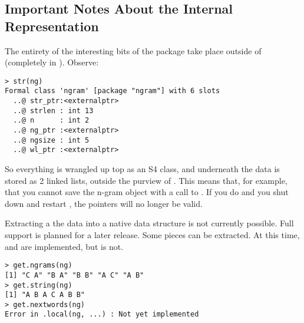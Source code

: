 \subsection{Important Notes About the Internal Representation}

The entirety of the interesting bits of the \thispackage package take place 
outside of \R (completely in \C).  Observe:
\begin{lstlisting}[language=inteRactive]
> str(ng)
Formal class 'ngram' [package "ngram"] with 6 slots
  ..@ str_ptr:<externalptr> 
  ..@ strlen : int 13
  ..@ n      : int 2
  ..@ ng_ptr :<externalptr> 
  ..@ ngsize : int 5
  ..@ wl_ptr :<externalptr> 
\end{lstlisting}

So everything is wrangled up top as an S4 class, and underneath the data is 
stored as 2 linked lists, outside the purview of \R.  This means that, for 
example, that you cannot save the n-gram object with a call to .  
If you do and you shut down and restart \R, the pointers will no longer be 
valid.

Extracting a the data into a native \R data structure is not currently 
possible.  Full support is planned for a later release.  Some pieces can be 
extracted.  At this time,  and  are 
implemented, but  is not.

\begin{lstlisting}[language=inteRactive]
> get.ngrams(ng)
[1] "C A" "B A" "B B" "A C" "A B"
> get.string(ng)
[1] "A B A C A B B"
> get.nextwords(ng)
Error in .local(ng, ...) : Not yet implemented
\end{lstlisting}
